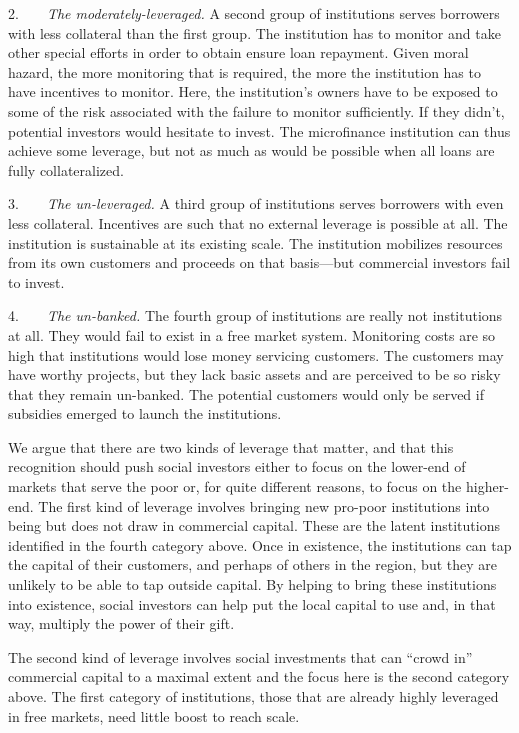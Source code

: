 \documentclass[
]{article}
\begin{document}
2.  \emph{The moderately-leveraged.} A second group of institutions
serves borrowers with less collateral than the first group. The
institution has to monitor and take other special efforts in order to
obtain ensure loan repayment. Given moral hazard, the more monitoring
that is required, the more the institution has to have incentives to
monitor. Here, the institution's owners have to be exposed to some of
the risk associated with the failure to monitor sufficiently. If they
didn't, potential investors would hesitate to invest. The microfinance
institution can thus achieve some leverage, but not as much as would be
possible when all loans are fully collateralized.

3.  \emph{The un-leveraged.} A third group of institutions serves
borrowers with even less collateral. Incentives are such that no
external leverage is possible at all. The institution is sustainable at
its existing scale. The institution mobilizes resources from its own
customers and proceeds on that basis---but commercial investors fail to
invest.

4.  \emph{The un-banked.} The fourth group of institutions are really
not institutions at all. They would fail to exist in a free market
system. Monitoring costs are so high that institutions would lose money
servicing customers. The customers may have worthy projects, but they
lack basic assets and are perceived to be so risky that they remain
un-banked. The potential customers would only be served if subsidies
emerged to launch the institutions.

We argue that there are two kinds of leverage that matter, and that this
recognition should push social investors either to focus on the
lower-end of markets that serve the poor or, for quite different
reasons, to focus on the higher-end. The first kind of leverage involves
bringing new pro-poor institutions into being but does not draw in
commercial capital. These are the latent institutions identified in the
fourth category above. Once in existence, the institutions can tap the
capital of their customers, and perhaps of others in the region, but
they are unlikely to be able to tap outside capital. By helping to bring
these institutions into existence, social investors can help put the
local capital to use and, in that way, multiply the power of their gift.

The second kind of leverage involves social investments that can ``crowd
in'' commercial capital to a maximal extent and the focus here is the
second category above. The first category of institutions, those that
are already highly leveraged in free markets, need little boost to reach
scale.
\end{document}
